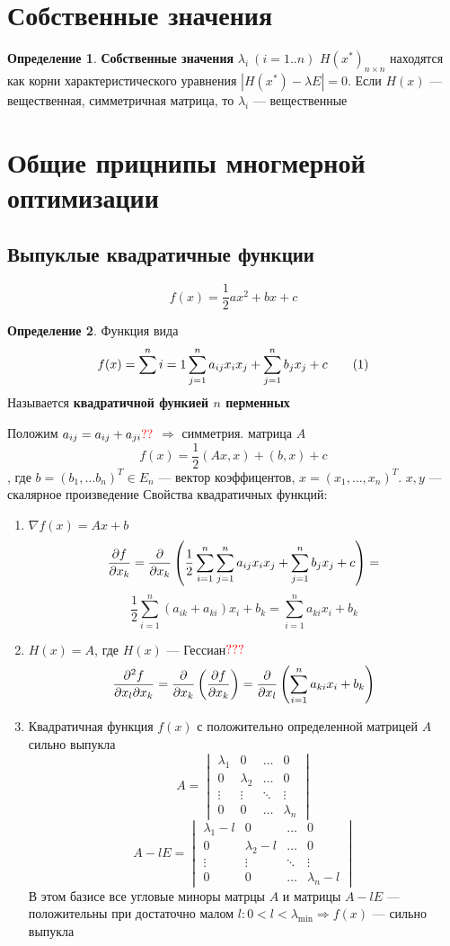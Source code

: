 \documentclass[oneside]{book}
\newcommand\addtag{\refstepcounter{equation}\tag{\theequation}}
\theoremstyle{plain}
\theoremstyle{remark}
\theoremstyle{definition}
\newtheorem*{definition}{Определение}
\begin{document}
\section{Собственные значения}
\label{sec:org0ae451c}
\begin{definition}
\textbf{Собственные значения} \(\lambda_i\ (i = 1..n)\) \(H(x^*)_{n\times n}\) находятся как корни характеристического уравнения \(|H(x^*) - \lambda E| = 0\). Если \(H(x)\) --- вещественная, симметричная матрица, то \(\lambda_i\) --- вещественные
\end{definition}
\section{Общие прицнипы многмерной оптимизации}
\label{sec:org8356b55}
\subsection{Выпуклые квадратичные функции}
\label{sec:org2dfca3e}
\[ f(x) = \frac{1}{2}ax^2 + bx + c \]
\begin{definition}
Функция вида
\[ f(x) = \sum^n{i = 1}\sum^n_{j = 1}a_{ij}x_ix_j + \sum^n_{j = 1}b_j x_j + c \addtag\label{7_1_quad} \]
Называется \textbf{квадратичной функией \(n\) перменных}
\end{definition}
Положим \(a_{ij} = a_{ij} + a_{ji} {\color{red}??}\) \(\Rightarrow\) симметрия. матрица \(A\)
\[ f(x) = \frac{1}{2}(Ax, x) + (b, x) + c \]
, где \(b = (b_1, \dots b_n)^T \in E_n\) --- вектор коэффицентов, \(x = (x_1, \dots, x_n)^T\). \(x, y\) --- скалярное произведение
Свойства квадратичных функций:
\begin{enumerate}
\item \(\nabla f(x) = Ax + b\)
\[ \frac{\partial f}{\partial x_k} = \frac{\partial }{\partial x_k}\left(\frac{1}{2}\sum^n_{i = 1}\sum^n_{j = 1}a_{ij}x_ix_j + \sum^n_{j = 1}b_j x_j + c\right) = \]
\[ \frac{1}{2}\sum^n_{i = 1}(a_{ik} + a_{ki})x_i + b_k = \sum^n_{i = 1} a_{ki}x_i + b_k \]
\item \(H(x) = A\), где \(H(x)\) --- Гессиан\(\color{red}???\) 
\[ \frac{\partial ^2 f}{\partial x_l \partial x_k} = \frac{\partial }{\partial x_k}\left(\frac{\partial f}{\partial x_k}\right) = \frac{\partial }{\partial x_l}\left(\sum^n_{i = 1} a_{ki} x_i + b_k\right) \]
\item Квадратичная функция \(f(x)\) с положительно определенной матрицей \(A\) сильно выпукла
\[ A = \begin{vmatrix} \lambda_1 & 0 & \dots & 0 \\ 0 & \lambda_2 & \dots & 0 \\ \vdots & \vdots & \ddots & \vdots \\ 0 & 0 & \dots & \lambda_n \end{vmatrix} \]
\[ A - lE = \begin{vmatrix} \lambda_1 - l & 0 & \dots & 0 \\ 0 & \lambda_2 - l & \dots & 0 \\ \vdots & \vdots & \ddots & \vdots \\ 0 & 0 & \dots & \lambda_n - l \end{vmatrix} \]
В этом базисе все угловые миноры матрцы \(A\) и матрицы \(A - lE\) --- положительны при достаточно малом \(l: 0 < l < \lambda_\min \Rightarrow f(x)\) --- сильно выпукла
\end{enumerate}
\end{document}
